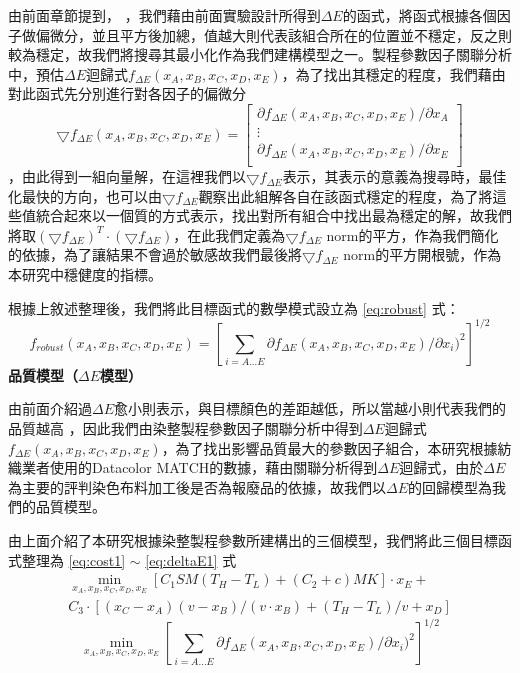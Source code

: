 由前面章節提到，
，我們藉由前面實驗設計所得到$\Delta E$的函式，將函式根據各個因子做偏微分，並且平方後加總，值越大則代表該組合所在的位置並不穩定，反之則較為穩定，故我們將搜尋其最小化作為我們建構模型之一。製程參數因子關聯分析中，預估$\Delta E$迴歸式$f_{\Delta E}(x_A,x_B,x_C,x_D,x_E)$，為了找出其穩定的程度，我們藉由對此函式先分別進行對各因子的偏微分
\begin{equation*}
	\bigtriangledown f_{\Delta E}(x_A,x_B,x_C,x_D,x_E) = {
		\left[
			\begin{array}{c}
			\partial f_{\Delta E}(x_A,x_B,x_C,x_D,x_E)/\partial x_A\\
			\vdots\\
			\partial f_{\Delta E}(x_A,x_B,x_C,x_D,x_E)/\partial x_E\\
			\end{array}
		\right]
	}
\end{equation*}
，由此得到一組向量解，在這裡我們以$\bigtriangledown f_{\Delta E}$表示，其表示的意義為搜尋時，最佳化最快的方向，也可以由$\bigtriangledown f_{\Delta E}$觀察出此組解各自在該函式穩定的程度，為了將這些值統合起來以一個質的方式表示，找出對所有組合中找出最為穩定的解，故我們將取$(\bigtriangledown f_{\Delta E})^T \cdot (\bigtriangledown f_{\Delta E} )$，在此我們定義為$\bigtriangledown f_{\Delta E}$ norm的平方，作為我們簡化的依據，為了讓結果不會過於敏感故我們最後將$\bigtriangledown f_{\Delta E}$ norm的平方開根號，作為本研究中穩健度的指標。

根據上敘述整理後，我們將此目標函式的數學模式設立為 \ref{eq:robust} 式：
\begin{equation}
	f_{robust}(x_A,x_B,x_C,x_D,x_E) = \left[
			\sum_{i=A\dots E}\partial f_{\Delta E}(x_A,x_B,x_C,x_D,x_E)/\partial x_i)^2
		\right]^{1/2}
\label{eq:robust}
\end{equation}
\textbf{品質模型（$\Delta E$模型）}

由前面介紹過$\Delta E$愈小則表示，與目標顏色的差距越低，所以當越小則代表我們的品質越高
，因此我們由染整製程參數因子關聯分析中得到$\Delta E$迴歸式$f_{\Delta E}(x_A,x_B,x_C,x_D,x_E)$，為了找出影響品質最大的參數因子組合，本研究根據紡織業者使用的Datacolor MATCH的數據，藉由關聯分析得到$\Delta E$迴歸式，由於$\Delta E$為主要的評判染色布料加工後是否為報廢品的依據，故我們以$\Delta E$的回歸模型為我們的品質模型。

由上面介紹了本研究根據染整製程參數所建構出的三個模型，我們將此三個目標函式整理為 \ref{eq:cost1} $
\sim$ \ref{eq:deltaE1} 式
\begin{equation}
	\begin{split}
	\min_{x_A,x_B,x_C,x_D,x_E} [C_1SM(T_H-T_L)+(C_2+c)MK]\cdot x_E+\\
	C_3 \cdot [(x_C-x_A)(v-x_B)/(v\cdot x_B) +(T_H-T_L)/v+x_D]
	\end{split}
\label{eq:cost1}
\end{equation}
\begin{equation}
	\min_{x_A,x_B,x_C,x_D,x_E} \left[
		\sum_{i=A\dots E}\partial f_{\Delta E}(x_A,x_B,x_C,x_D,x_E)/\partial x_i)^2
	\right]^{1/2}
\label{eq:robust1}
\end{equation}

